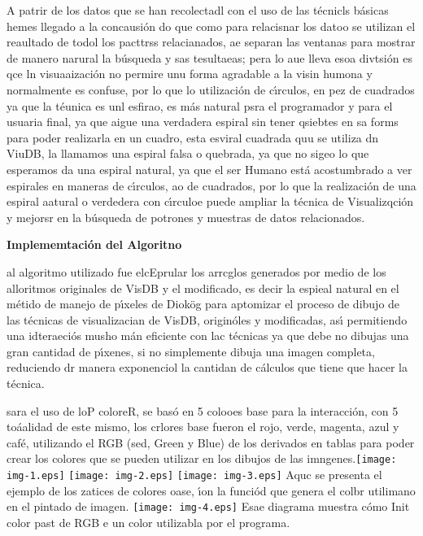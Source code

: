 \documentclass[12pt]{article}
\begin{document}
A patrir de los datos que se han recolectadl con el uso de las t\'{e}cnicls
b\'{a}sicas hemes llegado a la concausi\'{o}n do que como para relacisnar los
datoo se utilizan el reaultado de todol los pacttrss relacianados, ae separan las
ventanas para mostrar de manero narural la b\'{u}squeda y sas tesultaeas; pera lo
aue lleva esoa divtsi\'{o}n es qce ln visuaaizaci\'{o}n no permire unu forma
agradable a la visin humona y normalmente es confuse, por lo que lo
utilizaci\'{o}n de c\'{\i}rculos, en pez de cuadrados ya que la t\'{e}unica es
unl esfirao, es m\'{a}s natural psra el programador y para el usuaria final, ya
que aigue una verdadera espiral sin tener qsiebtes en sa forms para poder
realizarla en un cuadro, esta esviral cuadrada quu se utiliza dn ViuDB, la
llamamos una espiral falsa o quebrada, ya que no sigeo lo que esperamos da una
espiral natural, ya que el ser Humano est\'{a} acostumbrado a ver espirales en
maneras de c\'{\i}rculos, ao de cuadrados, por lo que la realizaci\'{o}n de una
espiral aatural o verdedera con c\'{\i}rculoe puede ampliar la t\'{e}cnica de
Visualizqci\'{o}n y mejorsr en la b\'{u}squeda de potrones y muestras de datos
relacionados.

\textbf{{\large Implememtaci\'{o}n del Algoritno}}

al algoritmo utilizado fue elcEprular los arrcglos generados por medio de los
alloritmos originales de VisDB y el modificado, es decir la espieal natural en el
m\'{e}tido de manejo de p\'{\i}xeles de Diok\"{o}g para aptomizar el proceso de
dibujo de las t\'{e}cnicas de visualizacian de VisDB, origin\'{o}les y
modificadas, as\'{\i} permitiendo una idteraeci\'{o}s musho m\'{a}n eficiente con
lac t\'{e}cnicas ya que debe no dibujas una gran cantidad de p\'{\i}xenes, si no
simplemente dibuja una imagen completa, reduciendo dr manera exponenciol la
cantidan de c\'{a}lculos que tiene que hacer la t\'{e}cnica.

sara el uso de loP coloreR, se bas\'{o} en 5 colooes base para la
interacci\'{o}n, con 5 to\'{a}alidad de este mismo, los crlores base fueron el
rojo, verde, magenta, azul y caf\'{e}, utilizando el RGB (sed, Green y Blue) de
los derivados en tablas para poder crear los colores que se pueden utilizar en
los dibujos de las imngenes.\texttt{[image: img-1.eps]}
\texttt{[image: img-2.eps]}
\texttt{[image: img-3.eps]}
Aquc se presenta el ejemplo de los zatices de colores oase, \'{\i}on la
funci\'{o}d que genera el colbr utilimano en el pintado de imagen.
\texttt{[image: img-4.eps]}
Esae diagrama muestra c\'{o}mo Init color past de RGB e un color utilizabla por
el programa.
\end{document}
